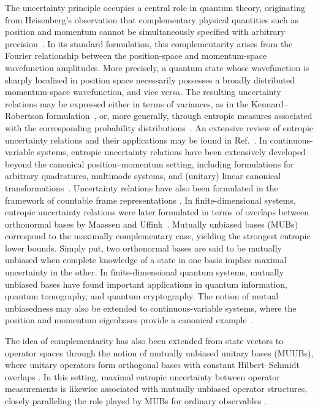 \documentclass[aps,pra,onecolumn,nofootinbib,superscriptaddress,showpacs]{revtex4}
\begin{document}
\noindent The uncertainty principle occupies a central role in quantum theory,
originating from Heisenberg's observation that complementary physical
quantities such as position and momentum cannot be simultaneously
specified with arbitrary precision~\cite{Heisenberg1927}. In its standard formulation, this complementarity
arises from the Fourier relationship between the position-space and
momentum-space wavefunction amplitudes. More precisely, a quantum state whose
wavefunction is sharply localized in position space necessarily
possesses a broadly distributed momentum-space wavefunction, and vice
versa. The resulting uncertainty relations may be
expressed either in terms of variances, as in the
Kennard--Robertson formulation~\cite{Robertson1929}, or,
more generally, through entropic measures associated with the
corresponding probability distributions~\cite{Hirschman1957,Beckner1975,Bialynicki1975}. An extensive review of entropic uncertainty relations and their
applications may be found in Ref.~\cite{Coles2017}. In continuous-variable systems, entropic uncertainty relations have been extensively developed beyond the canonical position--momentum setting, including formulations for arbitrary quadratures, multimode systems, and (unitary) linear canonical transformations~\cite{Cerf1,Cerf2}. Uncertainty relations have also been formulated in the framework of countable frame representations \cite{Ricaud2013}.
In finite-dimensional systems, entropic uncertainty
relations were later formulated in terms of overlaps
between orthonormal bases by Maassen and
Uffink~\cite{Maassen1988}. Mutually unbiased bases (MUBs) \cite{Schwinger,Durt}
correspond to the maximally complementary case,
yielding the strongest entropic lower bounds. Simply put, two orthonormal bases are said to be
mutually unbiased when complete knowledge of a state in one basis
implies maximal uncertainty in the other. In finite-dimensional quantum
systems, mutually unbiased bases have found important applications in
quantum information, quantum tomography, and quantum cryptography. The notion of mutual unbiasedness may also
be extended to continuous-variable systems, where the
position and momentum eigenbases provide a canonical
example~\cite{Weigert2008}. 

The idea of complementarity has also been extended from state vectors to
operator spaces through the notion of mutually unbiased unitary bases
(MUUBs), where unitary operators form orthogonal bases with constant
Hilbert--Schmidt overlaps \cite{Scott2008, JRM2015}. In this setting,
maximal entropic uncertainty between operator
measurements is likewise associated with mutually
unbiased operator structures, closely paralleling the
role played by MUBs for ordinary observables \cite{JM2020, JRM2021}.
\end{document}
